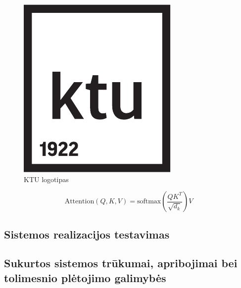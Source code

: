 \begin{figure}[H]
\centering
\includegraphics{ktu.pdf}
\caption{KTU logotipas}
\label{fig:ktu_logo}
\end{figure}

\begin{equation}
\text{Attention}(Q, K, V) = \text{softmax}\left(\frac{QK^T}{\sqrt{d_k}}\right) V
\end{equation}
\subsection{Sistemos realizacijos testavimas}
\subsection{Sukurtos sistemos trūkumai, apribojimai bei tolimesnio plėtojimo galimybės}
